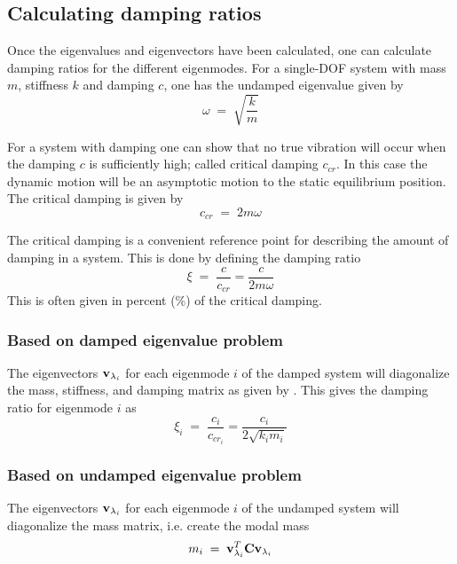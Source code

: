 \subsection{Calculating damping ratios}

Once the eigenvalues and eigenvectors have been calculated,
one can calculate damping ratios for the different eigenmodes.
For a single-DOF system with mass $m$, stiffness $k$ and damping $c$,
one has the undamped eigenvalue given by
%
\begin{equation}
\omega \;=\; \sqrt{\frac{k}{m}}
\end{equation}

For a system with damping one can show that no true vibration will occur when
the damping $c$ is sufficiently high; called critical damping $c_\textit{cr}$.
In this case the dynamic motion will be an asymptotic motion to the static
equilibrium position.
The critical damping is given by
%
\begin{equation}
c_\textit{cr} \;=\; 2 m \omega %
\end{equation}

The critical damping is a convenient reference point for describing
the amount of damping in a system.
This is done by defining the damping ratio
%
\begin{equation}
\xi \;=\; \frac{c}{c_\textit{cr}} = \frac{c}{2 m \omega}
\end{equation}
%
This is often given in percent (\%) of the critical damping.

\subsubsection{Based on damped eigenvalue problem}

The eigenvectors ${\bf v}_{\lambda_i}$ for each eigenmode $i$ of the damped
system will diagonalize the mass, stiffness, and damping matrix
as given by .
This gives the damping ratio for eigenmode $i$ as
%
\begin{equation}
\xi_i \;=\; \frac{c_i}{c_{\textit{cr}_i}} = \frac{c_i}{2 \sqrt{k_i m_i}}
\end{equation}

\subsubsection{Based on undamped eigenvalue problem}

The eigenvectors ${\bf v}_{\lambda_i}$ for each eigenmode $i$ of the undamped
system will diagonalize the mass matrix, i.e. create the modal mass
%
\begin{equation}
m_i \;=\; {\bf v}_{\lambda_i}^T {\bf C}{\bf v}_{\lambda_i}
\label{eq:modalMass}
\end{equation}

